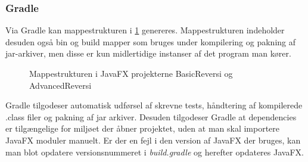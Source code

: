 \subsubsection{Gradle}
Via Gradle kan mappestrukturen i \cref{fig:tree} genereres. Mappestrukturen indeholder desuden også bin og build mapper som bruges under kompilering og pakning af jar-arkiver, men disse er kun midlertidige instanser af det program man kører.
\begin{figure}[H]
    \caption{Mappestrukturen i JavaFX projekterne BasicReversi og AdvancedReversi}\label{fig:tree}
\end{figure}

Gradle tilgodeser automatisk udførsel af skrevne tests, håndtering af kompilerede .class filer og pakning af jar arkiver. Desuden tilgodeser Gradle at dependencies er tilgængelige for miljøet der åbner projektet, uden at man skal importere JavaFX moduler manuelt. Er der en fejl i den version af JavaFX der bruges, kan man blot opdatere versionsnummeret i \emph{build.gradle} og herefter opdateres JavaFX.
